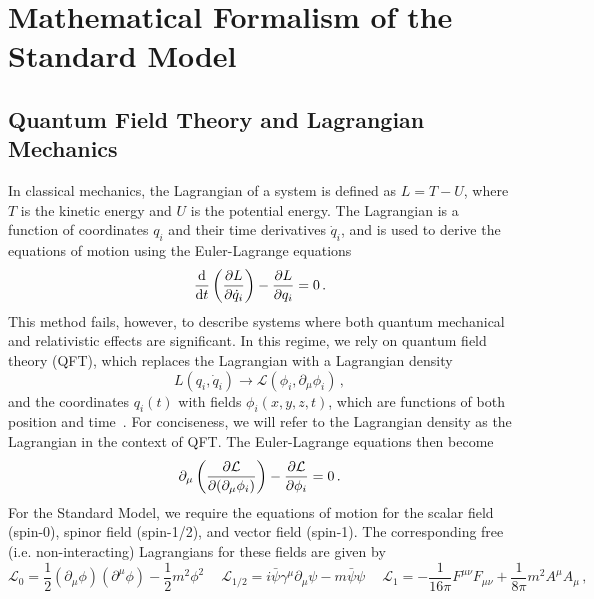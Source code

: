 \chapter{Mathematical Formalism of the Standard Model} \label{sec:sm_theory}

\section{Quantum Field Theory and Lagrangian Mechanics} \label{sec:sm_theory_qft}
In classical mechanics, the Lagrangian of a system is defined as $L=T-U$, where $T$ is the kinetic energy and $U$ is the potential energy. The Lagrangian is a function of coordinates $q_i$ and their time derivatives $\dot{q}_i$, and is used to derive the equations of motion using the Euler-Lagrange equations
\begin{equation}
	\label{eq:eulerlagrange_cm}
	\dv{}{t}\left(\pdv{L}{\dot{q}_i}\right)-\pdv{L}{q_i}=0\,.
\end{equation}
This method fails, however, to describe systems where both quantum mechanical and relativistic effects are significant. In this regime, we rely on quantum field theory (QFT), which replaces the Lagrangian with a Lagrangian density
\begin{equation}
	L(q_i,\dot{q}_i)\to\mathcal{L}(\phi_i,\partial_\mu\phi_i)\,,
\end{equation}
and the coordinates $q_i(t)$ with fields $\phi_i(x,y,z,t)$, which are functions of both position and time~\cite{Thomson_2013}. For conciseness, we will refer to the Lagrangian density as the Lagrangian in the context of QFT. The Euler-Lagrange equations then become
\begin{equation}
	\label{eq:eulerlagrange_qft}
	\partial_\mu\left(\pdv{\mathcal{L}}{(\partial_\mu\phi_i)}\right)-\pdv{\mathcal{L}}{\phi_i}=0\,.
\end{equation}
For the Standard Model, we require the equations of motion for the scalar field (spin-0), spinor field (spin-1/2), and vector field (spin-1). The corresponding free (i.e. non-interacting) Lagrangians for these fields are given by
\begin{equation}\label{eq:lagrangians}
	\mathcal{L}_0=\frac{1}{2}\left(\partial_\mu\phi\right)\left(\partial^\mu\phi\right)-\frac{1}{2}m^2\phi^2\quad \ 
	\mathcal{L}_{1/2}=i\bar{\psi}\gamma^\mu\partial_\mu\psi-m\bar{\psi}\psi \quad \ 
	\mathcal{L}_{1}=-\frac{1}{16\pi}F^{\mu\nu}F_{\mu\nu}+\frac{1}{8\pi}m^2A^\mu A_\mu\,,
\end{equation}
